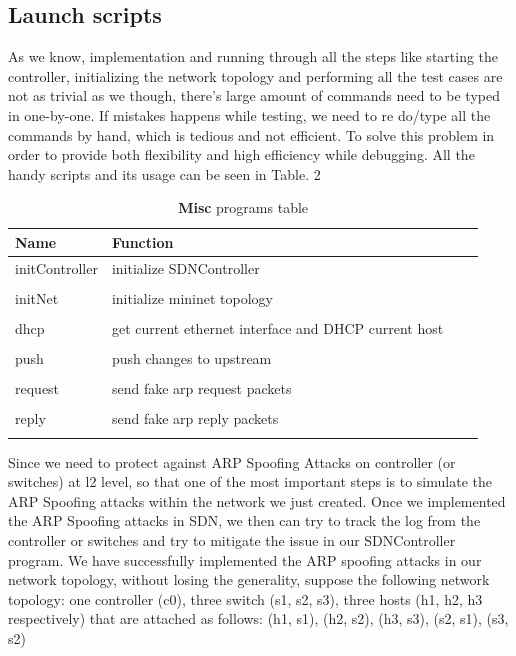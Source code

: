 \documentclass[conference]{IEEEtran}
\begin{document}
\subsection{Launch scripts}
As we know, implementation and running through all the steps like starting the controller, initializing the network topology and performing all the test cases are not as trivial as we though, there's large amount of commands need to be typed in one-by-one. If mistakes happens while testing, we need to re do/type all the commands by hand, which is tedious and not efficient. To solve this problem in order to provide both flexibility and high efficiency while debugging. All the handy scripts and its usage can be seen in Table. 2
\begin{table}[H]
		\caption{\textbf{Misc} programs table}
		\label{Tab:Scripts}
		\centering
		\begin{tabular}{lp{3cm}p{2cm}p{0cm}}
			\toprule
			\textbf{Name} &\textbf{Function}&\\
			\midrule
			initController        &initialize SDNController   \\\\
			initNet               &initialize mininet topology\\\\
			dhcp                  &get current ethernet interface and DHCP current host\\\\
			push                  &push changes to upstream\\\\
			\midrule
			request               &send fake arp request packets\\\\
			reply                 &send fake arp reply packets\\\\
			\bottomrule
		\end{tabular}
\end{table}

Since we need to protect against ARP Spoofing Attacks on controller (or switches) at l2 level, so that one of the most important steps is to simulate the ARP Spoofing attacks within the network we just created. Once we implemented the ARP Spoofing attacks in SDN, we then can try to track the log from the controller or switches and try to mitigate the issue in our SDNController program. We have successfully implemented the ARP spoofing attacks in our network topology, without losing the generality, suppose the following network topology: one controller (c0), three switch (s1, s2, s3), three hosts (h1, h2, h3 respectively) that are attached as follows: (h1, s1), (h2, s2), (h3, s3), (s2, s1), (s3, s2)\newline
\end{document}
